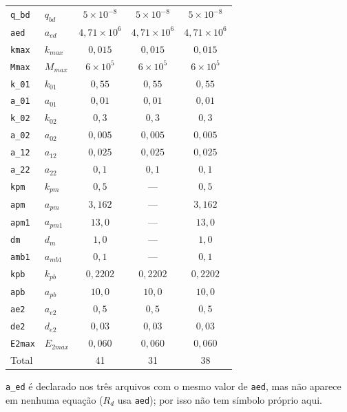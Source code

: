 \documentclass[11pt]{article}
\begin{document}
\begin{longtable}{llccc}
\texttt{q\_bd}  & $q_{bd}$     & $5\times10^{-8}$ & $5\times10^{-8}$ & $5\times10^{-8}$ \\
\texttt{aed}    & $a_{ed}$     & $4{,}71\times10^{6}$ & $4{,}71\times10^{6}$ & $4{,}71\times10^{6}$ \\
\texttt{kmax}   & $k_{max}$    & $0{,}015$ & $0{,}015$ & $0{,}015$ \\
\texttt{Mmax}   & $M_{max}$    & $6\times10^{5}$ & $6\times10^{5}$ & $6\times10^{5}$ \\
\texttt{k\_01}  & $k_{01}$     & $0{,}55$ & $0{,}55$ & $0{,}55$ \\
\texttt{a\_01}  & $a_{01}$     & $0{,}01$ & $0{,}01$ & $0{,}01$ \\
\texttt{k\_02}  & $k_{02}$     & $0{,}3$ & $0{,}3$ & $0{,}3$ \\
\texttt{a\_02}  & $a_{02}$     & $0{,}005$ & $0{,}005$ & $0{,}005$ \\
\texttt{a\_12}  & $a_{12}$     & $0{,}025$ & $0{,}025$ & $0{,}025$ \\
\texttt{a\_22}  & $a_{22}$     & $0{,}1$ & $0{,}1$ & $0{,}1$ \\
\texttt{kpm}    & $k_{pm}$     & $0{,}5$ & --- & $0{,}5$ \\
\texttt{apm}    & $a_{pm}$     & $3{,}162$ & --- & $3{,}162$ \\
\texttt{apm1}   & $a_{pm1}$    & $13{,}0$ & --- & $13{,}0$ \\
\texttt{dm}     & $d_m$        & $1{,}0$ & --- & $1{,}0$ \\
\texttt{amb1}   & $a_{mb1}$    & $0{,}1$ & --- & $0{,}1$ \\
\texttt{kpb}    & $k_{pb}$     & $0{,}2202$ & $0{,}2202$ & $0{,}2202$ \\
\texttt{apb}    & $a_{pb}$     & $10{,}0$ & $10{,}0$ & $10{,}0$ \\
\texttt{ae2}    & $a_{e2}$     & $0{,}5$ & $0{,}5$ & $0{,}5$ \\
\texttt{de2}    & $d_{e2}$     & $0{,}03$ & $0{,}03$ & $0{,}03$ \\
\texttt{E2max}  & $E_{2max}$   & $0{,}060$ & $0{,}060$ & $0{,}060$ \\
\midrule
\multicolumn{2}{l}{Total} & 41 & 31 & 38 \\
\bottomrule
\end{longtable}

\texttt{a\_ed} é declarado nos três arquivos com o mesmo valor de \texttt{aed}, mas não
aparece em nenhuma equação ($R_d$ usa \texttt{aed}); por isso não tem símbolo próprio aqui.
\end{document}
